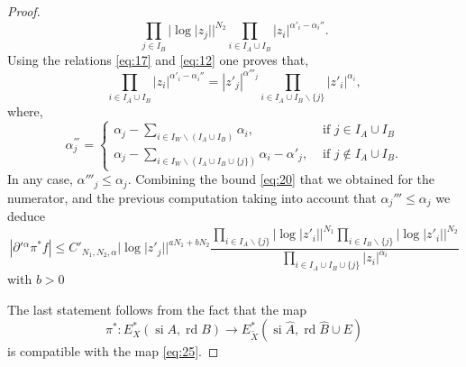 \documentclass[10pt,a4paper]{amsart}
\DeclareMathOperator{\rd}{rd}
\DeclareMathOperator{\si}{si}
\begin{document}
\begin{proof}
\begin{displaymath}
{      \prod_{j\in I_B}|\log|z_j||^{N_2}}
    {\prod_{i\in I_{A}\cup I_{B}}|z_{i}|^{\alpha' _{i}-\alpha _{i}''}}.
  \end{displaymath}
  Using the relations \eqref{eq:17} and \eqref{eq:12} one proves
  that,
  \begin{displaymath}
    \prod_{i\in I_{A}\cup I_{B}}|z_{i}|^{\alpha' _{i}-\alpha _{i}''}=
    |z'_{j}|^{\alpha''' _{j}}\prod_{i\in I_{A}\cup I_{B}\smallsetminus \{j\}}|z'_{i}|^{\alpha_{i}},
  \end{displaymath}
where, 
\begin{displaymath}
  \alpha ^{'''}_{j}=
  \begin{cases}
    \alpha _{j}-\sum_{i\in I_{W}\smallsetminus (I_{A}\cup
    I_{B})}\alpha _{i}, &\text{ if }j\in I_{A}\cup I_{B}\\
    \alpha _{j}-\sum_{i\in I_{W}\smallsetminus (I_{A}\cup
    I_{B}\cup \{j\})}\alpha _{i}-\alpha '_{j}, &\text{ if }j\not \in
                                                 I_{A}\cup I_{B}.
  \end{cases}
\end{displaymath}
In any case, $\alpha '''_{j}\le \alpha _{j}$.  Combining the bound
 \eqref{eq:20} that we obtained for the numerator, and the previous
 computation taking into account that $\alpha _{j}'''\le \alpha _{j}$
 we deduce
 \begin{displaymath}
   \left |\partial'{} ^{\alpha }\pi ^{\ast }f\right |\le
   C'_{N_{1},N_{2},\alpha }|\log|z'_j||^{aN_{1}+bN_2}\frac 
    {\displaystyle  \prod_{i\in I_A\smallsetminus \{j\}}|\log|z'_i||^{N_1}
   \prod_{i\in I_{B}\smallsetminus
     \{j\}}|\log|z'_i||^{N_2}}{\displaystyle  \prod_{i\in I_{A}\cup
     I_{B}\cup\{j\}}|z_{i}|^{\alpha _{i}}} 
 \end{displaymath}
 with $b> 0$


The last statement follows from the fact that the map
 \begin{displaymath}
 \pi ^{\ast}\colon E_{X}^\ast(\si A,\rd B) \to  E_{\widetilde X}^\ast(\si \widehat A,\rd
 \widehat B\cup E)
 \end{displaymath}
  is compatible with the map \eqref{eq:25}.
\end{proof}
\end{document}
